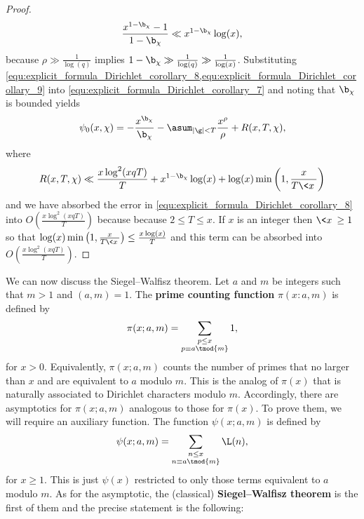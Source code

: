 \begin{proof}
      \begin{equation}\label{equ:explicit_formula_Dirichlet_corollary_9}
        \frac{x^{1-\b_{\chi}}-1}{1-\b_{\chi}} \ll x^{1-\b_{\chi}}\log(x),
      \end{equation}
      because \(\rho \gg \frac{1}{\log(q)}\) implies \(1-\b_{\chi} \gg \frac{1}{\log(q)} \gg \frac{1}{\log(x)}\). Substituting \cref{equ:explicit_formula_Dirichlet_corollary_8,equ:explicit_formula_Dirichlet_corollary_9} into \cref{equ:explicit_formula_Dirichlet_corollary_7} and noting that \(\b_{\chi}\) is bounded yields
      \begin{equation}\label{equ:explicit_formula_Dirichlet_corollary_10}
        \psi_{0}(x,\chi) = -\frac{x^{\b_{\chi}}}{\b_{\chi}}-\asum_{|\g| < T}\frac{x^{\rho}}{\rho}+R(x,T,\chi),
      \end{equation}
      where
      \[
        R(x,T,\chi) \ll \frac{x\log^{2}(xqT)}{T}+x^{1-\b_{\chi}}\log(x)+\log(x)\min\left(1,\frac{x}{T\<x\>}\right)
      \]
      and we have absorbed the error in \cref{equ:explicit_formula_Dirichlet_corollary_8} into \(O\left(\frac{x\log^{2}(xqT)}{T}\right)\) because because \(2 \le T \le x\). If \(x\) is an integer then \(\<x\> \ge 1\) so that \(\log(x)\min\left(1,\frac{x}{T\<x\>}\right) \le \frac{x\log(x)}{T}\) and this term can be absorbed into \(O\left(\frac{x\log^{2}(xqT)}{T}\right)\).
    \end{proof}
    
    We can now discuss the Siegel–Walfisz theorem. Let \(a\) and \(m\) be integers such that \(m > 1\) and \((a,m) = 1\). The \textbf{prime counting function} \(\pi(x:a,m)\) is defined by
    \[
      \pi(x;a,m) = \sum_{\substack{p \le x \\ p \equiv a \tmod{m}}}1,
    \]
    for \(x > 0\). Equivalently, \(\pi(x;a,m)\) counts the number of primes that no larger than \(x\) and are equivalent to \(a\) modulo \(m\). This is the analog of \(\pi(x)\) that is naturally associated to Dirichlet characters modulo \(m\). Accordingly, there are asymptotics for \(\pi(x;a,m)\) analogous to those for \(\pi(x)\). To prove them, we will require an auxiliary function. The function \(\psi(x;a,m)\) is defined by
    \[
      \psi(x;a,m) = \sum_{\substack{n \le x \\ n \equiv a \tmod{m}}}\L(n),
    \]
    for \(x \ge 1\). This is just \(\psi(x)\) restricted to only those terms equivalent to \(a\) modulo \(m\). As for the asymptotic, the (classical) \textbf{Siegel–Walfisz theorem} is the first of them and the precise statement is the following:

